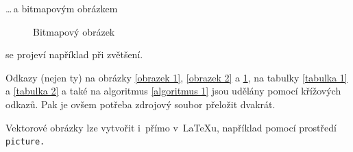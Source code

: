 \documentclass[a4paper, 11pt]{article}
\begin{document}
\bigskip
\noindent\dots\,a bitmapovým obrázkem

\begin{figure}[h]

\centering
\caption{Bitmapový obrázek} \label{obrazek 3}
	
\end{figure}

\bigskip
\noindent se projeví například při zvětšení.

Odkazy (nejen ty) na obrázky \ref{obrazek 1}, \ref{obrazek 2} a \ref{obrazek 3}, na tabulky \ref{tabulka 1} a \ref{tabulka 2} a také na algoritmus \ref{algoritmus 1} jsou udělány pomocí křížových odkazů. Pak je ovšem potřeba zdrojový soubor přeložit dvakrát.

Vektorové obrázky lze vytvořit i~přímo v~\LaTeX u, například pomocí prostředí\texttt{  picture. }
	
\pagebreak
\end{document}
